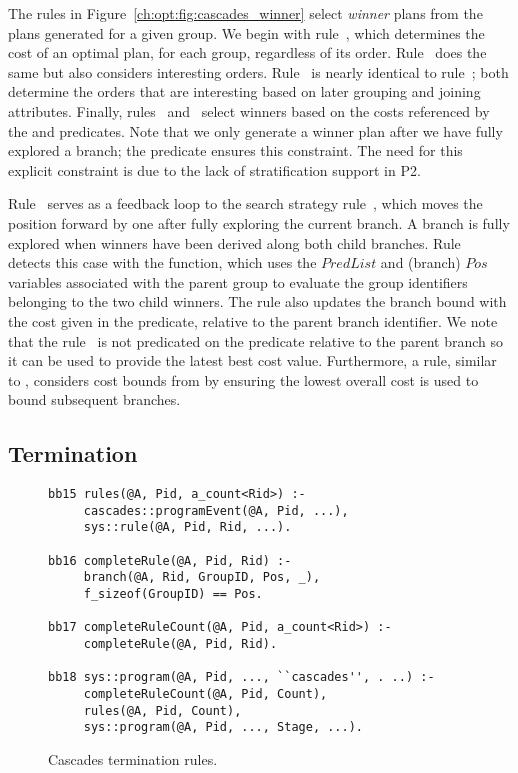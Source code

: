 The rules in Figure~\ref{ch:opt:fig:cascades_winner} select {\em winner} plans
from the plans generated for a given group.  We begin with rule~, which
determines the cost of an optimal plan, for each group, regardless of its
order.  Rule~ does the same but also considers interesting orders.
Rule~ is nearly identical to rule~; both determine the orders
that are interesting based on later grouping and joining attributes.  Finally,
rules~ and~ select winners based on the costs referenced by
the  and  predicates.  Note that we only
generate a winner plan after we have fully explored a branch; the  predicate ensures this constraint.  The need for this
explicit constraint is due to the lack of stratification support in P2.

Rule~ serves as a feedback loop to the search strategy rule~,
which moves the  position forward by one after fully exploring the
current branch.  A branch is fully explored when winners have been derived
along both child branches.  Rule~ detects this case with the
 function, which uses the $PredList$ and (branch)
$Pos$ variables associated with the parent group to evaluate the group
identifiers belonging to the two child winners.  The rule also updates the
branch bound with the cost given in the  predicate, relative
to the parent branch identifier.  We note that the rule~ is not
predicated on the  predicate relative to the parent branch so it can
be used to provide the latest best cost value.  Furthermore, a rule, similar to
, considers cost bounds from  by ensuring the lowest
overall cost is used to bound subsequent branches.

\subsection{Termination}
\label{ch:opt:sec:cascadesend}

\begin{figure*}
\ssp
\centering
\begin{lstlisting}
bb15 rules(@A, Pid, a_count<Rid>) :-
     cascades::programEvent(@A, Pid, ...),
     sys::rule(@A, Pid, Rid, ...).

bb16 completeRule(@A, Pid, Rid) :-
     branch(@A, Rid, GroupID, Pos, _),
     f_sizeof(GroupID) == Pos.

bb17 completeRuleCount(@A, Pid, a_count<Rid>) :-
     completeRule(@A, Pid, Rid).

bb18 sys::program(@A, Pid, ..., ``cascades'', . ..) :-
     completeRuleCount(@A, Pid, Count),
     rules(@A, Pid, Count),
     sys::program(@A, Pid, ..., Stage, ...).
\end{lstlisting}
\caption{\label{ch:opt:fig:cascadesend}Cascades termination rules.}
\end{figure*}

